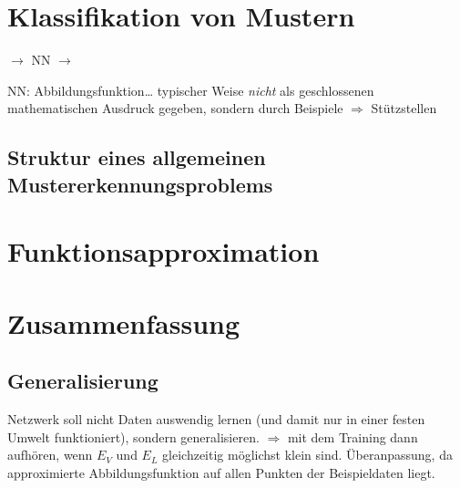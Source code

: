 \section{Klassifikation von Mustern}
\begin{center}
 $\to$ NN $\to$ 
\end{center}
NN: Abbildungsfunktion… typischer Weise \emph{nicht} als geschlossenen mathematischen Ausdruck gegeben, sondern durch Beispiele $\Rightarrow$ Stützstellen
\subsection{Struktur eines allgemeinen Mustererkennungsproblems}

\section{Funktionsapproximation}

\section{Zusammenfassung}
\subsection{Generalisierung}
Netzwerk soll nicht Daten auswendig lernen (und damit nur in einer festen Umwelt funktioniert), sondern generalisieren.
$\Rightarrow$ mit dem Training dann aufhören, wenn $E_V$ und $E_L$ gleichzeitig möglichst klein sind.
Überanpassung, da approximierte Abbildungsfunktion auf allen Punkten der Beispieldaten liegt.
